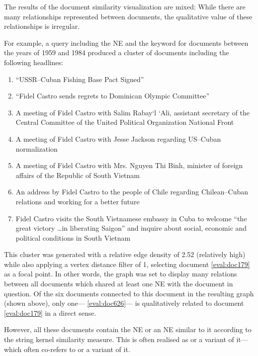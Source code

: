 The results of the document similarity visualization are mixed: While there are many relationships represented between documents, the qualitative value of these relationships is irregular.

For example, a query including the NE  and the keyword  for documents between the years of 1959 and 1984 produced a cluster of documents including the following headlines:

\begin{enumerate}
\item ``USSR--Cuban Fishing Base Pact Signed''\label{eval:doc179}
\item ``Fidel Castro sends regrets to Dominican Olympic Committee''\label{eval:doc553}
\item A meeting of Fidel Castro with Salim Rabay`l `Ali, assistant secretary of the Central Committee of the United Political Organization National Front\label{eval:doc682}
\item A meeting of Fidel Castro with Jesse Jackson regarding US--Cuban normalization\label{eval:doc879}
\item A meeting of Fidel Castro with Mrs. Nguyen Thi Binh, minister of foreign affairs of the Republic of South Vietnam\label{eval:doc643}
\item An address by Fidel Castro to the people of Chile regarding Chilean--Cuban relations and working for a better future\label{eval:doc391}
\item Fidel Castro visits the South Vietnamese embassy in Cuba to welcome ``the great victory \ldots in liberating Saigon'' and inquire about social, economic and political conditions in South Vietnam\label{eval:doc626}
\end{enumerate} 

This cluster was generated with a relative edge density of 2.52 (relatively high) while also applying a vertex distance filter of 1, selecting document \ref{eval:doc179} as a focal point. In other words, the graph was set to display many relations between all documents which shared at least one NE with the document in question. Of the six documents connected to this document in the resulting graph (shown above), only one--- \ref{eval:doc626}--- is qualitatively related to document \ref{eval:doc179} in a direct sense.

However, all these documents contain the NE  or an NE similar to it according to the string kernel similarity measure. This is often realised as  or a variant of it--- which often co-refers to  or a variant of it.

